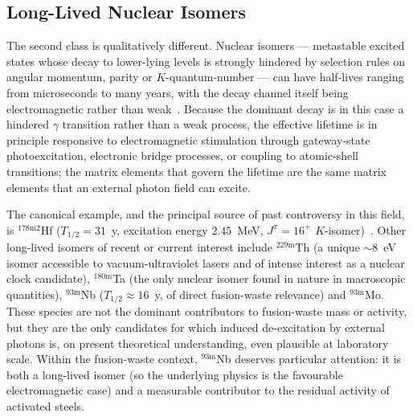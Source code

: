 \documentclass[conference]{IEEEtran}
\begin{document}
\subsection{Long-Lived Nuclear Isomers}
The second class is qualitatively different. Nuclear isomers --- metastable excited states whose decay to lower-lying levels is strongly hindered by selection rules on angular momentum, parity or $K$-quantum-number --- can have half-lives ranging from microseconds to many years, with the decay channel itself being electromagnetic rather than weak~\cite{walker1999nature,walker2020isomers}. Because the dominant decay is in this case a hindered $\gamma$ transition rather than a weak process, the effective lifetime is in principle responsive to electromagnetic stimulation through gateway-state photoexcitation, electronic bridge processes, or coupling to atomic-shell transitions; the matrix elements that govern the lifetime are the same matrix elements that an external photon field can excite.

The canonical example, and the principal source of past controversy in this field, is $^{178\mathrm{m}2}$Hf ($T_{1/2}=31$~y, excitation energy $2.45$~MeV, $J^\pi = 16^+$ $K$-isomer)~\cite{collins1999hafnium,ahmad2003hafnium}. Other long-lived isomers of recent or current interest include $^{229\mathrm{m}}$Th (a unique $\sim 8$~eV isomer accessible to vacuum-ultraviolet lasers and of intense interest as a nuclear clock candidate), $^{180\mathrm{m}}$Ta (the only nuclear isomer found in nature in macroscopic quantities), $^{93\mathrm{m}}$Nb ($T_{1/2} \approx 16$~y, of direct fusion-waste relevance) and $^{93\mathrm{m}}$Mo. These species are not the dominant contributors to fusion-waste mass or activity, but they are the only candidates for which induced de-excitation by external photons is, on present theoretical understanding, even plausible at laboratory scale. Within the fusion-waste context, $^{93\mathrm{m}}$Nb deserves particular attention: it is both a long-lived isomer (so the underlying physics is the favourable electromagnetic case) and a measurable contributor to the residual activity of activated steels.
\end{document}

